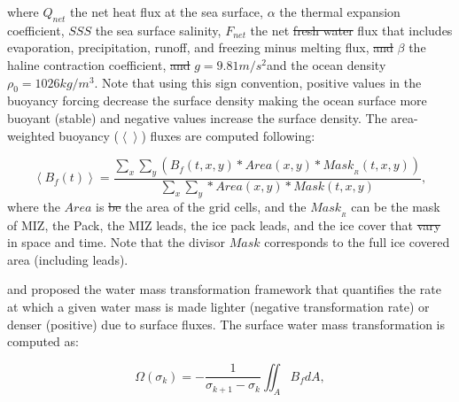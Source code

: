 \documentclass[lineno,sn-basic]{sn-jnl}%
\providecommand{\DIFadd}[1]{{\protect\color{blue}\uwave{#1}}} %
\providecommand{\DIFdel}[1]{{\protect\color{red}\sout{#1}}}                      %
\providecommand{\DIFaddbegin}{} %
\providecommand{\DIFaddend}{} %
\providecommand{\DIFdelbegin}{} %
\providecommand{\DIFdelend}{} %
\newcommand{\DIFscaledelfig}{0.5}
\newlength{\DIFdelgraphicswidth} %
\newlength{\DIFdelgraphicsheight} %
\newcommand{\DIFaddincludegraphics}[2][]{{\color{blue}\fbox{\DIFOincludegraphics[#1]{#2}}}} %
\newcommand{\DIFdelincludegraphics}[2][]{%
\sbox{\DIFdelgraphicsbox}{\DIFOincludegraphics[#1]{#2}}%
\settoboxwidth{\DIFdelgraphicswidth}{\DIFdelgraphicsbox} %
\settoboxtotalheight{\DIFdelgraphicsheight}{\DIFdelgraphicsbox} %
\scalebox{\DIFscaledelfig}{%
\parbox[b]{\DIFdelgraphicswidth}{\usebox{\DIFdelgraphicsbox}\\[-\baselineskip] \rule{\DIFdelgraphicswidth}{0em}}\llap{\resizebox{\DIFdelgraphicswidth}{\DIFdelgraphicsheight}{%
\setlength{\unitlength}{\DIFdelgraphicswidth}%
\begin{picture}(1,1)%
\thicklines\linethickness{2pt} %
{\color[rgb]{1,0,0}\put(0,0){\framebox(1,1){}}}%
{\color[rgb]{1,0,0}\put(0,0){\line( 1,1){1}}}%
{\color[rgb]{1,0,0}\put(0,1){\line(1,-1){1}}}%
\end{picture}%
}\hspace*{3pt}}} %
} %
\DeclareRobustCommand{\DIFaddbegin}{\DIFOaddbegin \let\includegraphics\DIFaddincludegraphics} %
\DeclareRobustCommand{\DIFaddend}{\DIFOaddend \let\includegraphics\DIFOincludegraphics} %
\DeclareRobustCommand{\DIFdelbegin}{\DIFOdelbegin \let\includegraphics\DIFdelincludegraphics} %
\DeclareRobustCommand{\DIFdelend}{\DIFOaddend \let\includegraphics\DIFOincludegraphics} %
\begin{document}
where $Q_{net}$ the net heat flux at the sea surface, $\alpha$ the thermal expansion coefficient, $SSS$ the sea surface salinity, $F_{net}$ the net \DIFdelbegin \DIFdel{fresh water }\DIFdelend \DIFaddbegin \DIFadd{freshwater }\DIFaddend flux that includes evaporation, precipitation, runoff, and freezing minus melting flux, \DIFdelbegin \DIFdel{and }\DIFdelend $\beta$ the haline contraction coefficient, \DIFdelbegin \DIFdel{and }\DIFdelend $g = 9.81 m/s^2$\DIFaddbegin \DIFadd{, }\DIFaddend and the ocean density $\rho_0 = 1026 kg/m^3$. 
Note that using this sign convention, positive values in the buoyancy forcing decrease the surface density making the ocean surface more buoyant (stable) and negative values increase the surface density. The area-weighted buoyancy ($ \left<\right>$) fluxes are computed following:

\begin{equation}
    \left<B_f (t)\right>  = \frac{\sum_x \sum_y \left( B_f(t,x,y) * Area(x,y) * Mask_{_R}(t,x,y)\right)}{\sum_x \sum_y * Area(x,y) * Mask(t,x,y)},
\end{equation}
where the $Area$ is \DIFdelbegin \DIFdel{be }\DIFdelend the area of the grid cells, and the $Mask_{_R}$ can be the mask of MIZ, the Pack, the MIZ leads, the ice pack leads, and the ice cover that \DIFdelbegin \DIFdel{vary }\DIFdelend \DIFaddbegin \DIFadd{varies }\DIFaddend in space and time. Note that the divisor $Mask$ corresponds to the full ice covered area (including leads).

\citet{Nurser_WMT_1999} and  \citet{Walin_WMT_1982} proposed the water mass transformation framework that quantifies the rate at which a given water mass is made lighter (negative transformation rate) or denser (positive) due to surface fluxes. The surface water mass transformation is computed as:

\begin{equation}
    \Omega(\sigma_k) = - \frac{1}{\sigma_{k+1}-\sigma_k}\iint_AB_fdA,
\end{equation}

\DIFdelbegin %
\end{document}
